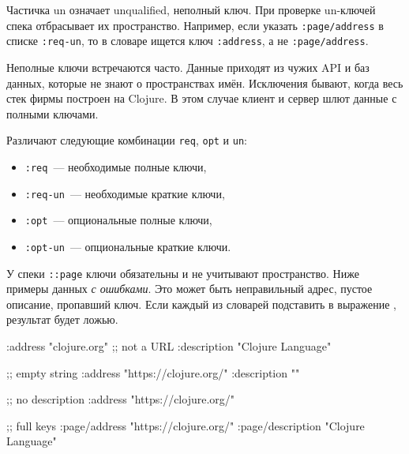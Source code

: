 
Частичка un означает unqualified, неполный ключ. При проверке un-ключей
спека отбрасывает их пространство. Например, если указать \verb|:page/address|
в списке \verb|:req-un|, то в словаре ищется ключ \verb|:address|, а не
\verb|:page/address|.

Неполные ключи встречаются часто. Данные приходят из чужих API и баз данных,
которые не знают о пространствах имён. Исключения бывают, когда весь стек фирмы
построен на Clojure. В этом случае клиент и сервер шлют данные с полными
ключами.

Различают следующие комбинации \verb|req|, \verb|opt| и \verb|un|:

\begin{itemize}

\item
  \verb|:req|~--- необходимые полные ключи,

\item
  \verb|:req-un|~--- необходимые краткие ключи,


\item
  \verb|:opt|~--- опциональные полные ключи,


\item
  \verb|:opt-un|~--- опциональные краткие ключи.

\end{itemize}

У спеки \verb|::page| ключи обязательны и не учитывают пространство. Ниже
примеры данных \emph{с ошибками}. Это может быть неправильный адрес, пустое
описание, пропавший ключ. Если каждый из словарей подставить в выражение
, результат будет ложью.

\ifx\devicetype\mobile

\begin{english}
  \begin{clojure}
{:address "clojure.org" ;; not a URL
 :description "Clojure Language"}

;; empty string
{:address "https://clojure.org/"
 :description ""}

;; no description
{:address "https://clojure.org/"}

 ;; full keys
{:page/address "https://clojure.org/"
 :page/description "Clojure Language"}
  \end{clojure}
\end{english}

